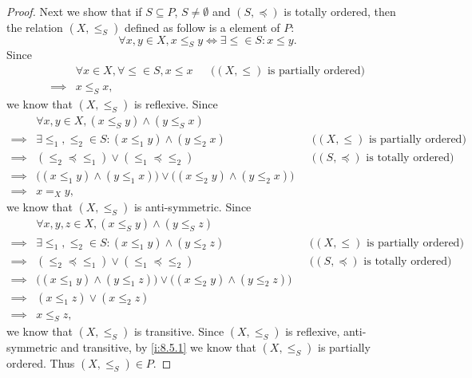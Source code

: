 \begin{proof}
  Next we show that if \(S \subseteq P\), \(S \neq \emptyset\) and \((S, \preceq)\) is totally ordered, then the relation \((X, \leq_S)\) defined as follow is a element of \(P\):
  \[
    \forall x, y \in X, x \leq_S y \iff \exists \leq \in S : x \leq y.
  \]
  Since
  \begin{align*}
             & \forall x \in X, \forall \leq \in S, x \leq x &  & \text{(\((X, \leq)\) is partially ordered)} \\
    \implies & x \leq_S x,
  \end{align*}
  we know that \((X, \leq_S)\) is reflexive.
  Since
  \begin{align*}
             & \forall x, y \in X, (x \leq_S y) \land (y \leq_S x)                                                                                        \\
    \implies & \exists \leq_1, \leq_2 \in S : (x \leq_1 y) \land (y \leq_2 x)                           &  & \text{(\((X, \leq)\) is partially ordered)}  \\
    \implies & (\leq_2 \preceq \leq_1) \lor (\leq_1 \preceq \leq_2)                                     &  & \text{(\((S, \preceq)\) is totally ordered)} \\
    \implies & \big((x \leq_1 y) \land (y \leq_1 x)\big) \lor \big((x \leq_2 y) \land (y \leq_2 x)\big)                                                   \\
    \implies & x =_X y,
  \end{align*}
  we know that \((X, \leq_S)\) is anti-symmetric.
  Since
  \begin{align*}
             & \forall x, y, z \in X, (x \leq_S y) \land (y \leq_S z)                                                                                     \\
    \implies & \exists \leq_1, \leq_2 \in S : (x \leq_1 y) \land (y \leq_2 z)                           &  & \text{(\((X, \leq)\) is partially ordered)}  \\
    \implies & (\leq_2 \preceq \leq_1) \lor (\leq_1 \preceq \leq_2)                                     &  & \text{(\((S, \preceq)\) is totally ordered)} \\
    \implies & \big((x \leq_1 y) \land (y \leq_1 z)\big) \lor \big((x \leq_2 y) \land (y \leq_2 z)\big)                                                   \\
    \implies & (x \leq_1 z) \lor (x \leq_2 z)                                                                                                             \\
    \implies & x \leq_S z,
  \end{align*}
  we know that \((X, \leq_S)\) is transitive.
  Since \((X, \leq_S)\) is reflexive, anti-symmetric and transitive, by \cref{i:8.5.1} we know that \((X, \leq_S)\) is partially ordered.
  Thus \((X, \leq_S) \in P\).


\end{proof}
